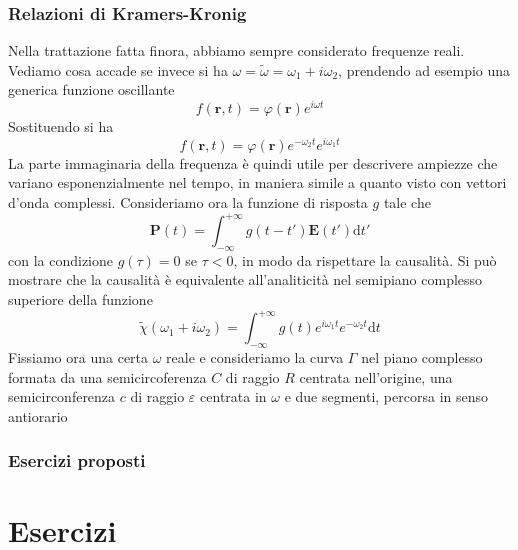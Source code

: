 \documentclass[a4paper,11pt]{book}
\renewcommand{\d}{\mathrm{d}}
\renewcommand{\vec}[1]{\mathbf{#1}}
\theoremstyle{theorem}
\theoremstyle{definition}
\begin{document}
\subsection{Relazioni di Kramers-Kronig}
Nella trattazione fatta finora, abbiamo sempre considerato frequenze reali. Vediamo cosa accade se invece si ha $\omega=\tilde{\omega}=\omega_1+i\omega_2$, prendendo ad esempio una generica funzione oscillante
\[f(\vec{r},t)=\varphi(\vec{r})e^{i\omega t}\]
Sostituendo si ha
\[f(\vec{r},t)=\varphi(\vec{r})e^{-\omega_2t}e^{i\omega_1t}\]
La parte immaginaria della frequenza è quindi utile per descrivere ampiezze che variano esponenzialmente nel tempo, in maniera simile a quanto visto con vettori d'onda complessi. Consideriamo ora la funzione di risposta $g$ tale che
\[\vec{P}(t)=\int_{-\infty}^{+\infty}g(t-t')\vec{E}(t')\d t'\]
con la condizione $g(\tau)=0$ se $\tau<0$, in modo da rispettare la causalità. Si può mostrare che la causalità è equivalente all'analiticità nel semipiano complesso superiore della funzione
\[\tilde{\chi}(\omega_1+i\omega_2)=\int_{-\infty}^{+\infty}g(t)e^{i\omega_1t}e^{-\omega_2t}\d t\]
Fissiamo ora una certa $\omega$ reale e consideriamo la curva $\Gamma$ nel piano complesso formata da una semicircoferenza $C$ di raggio $R$ centrata nell'origine, una semicirconferenza $c$ di raggio $\varepsilon$ centrata in $\omega$ e due segmenti, percorsa in senso antiorario
\begin{figure}[h]
	\centering
\end{figure}
\subsection{Esercizi proposti}
\chapter{Esercizi}
\end{document}
